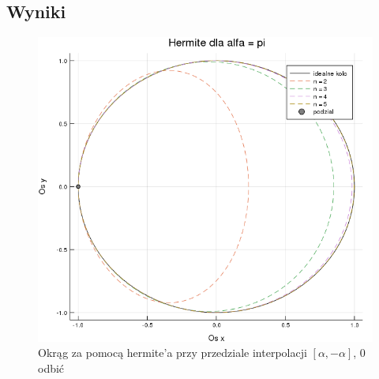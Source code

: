 \documentclass[paper=a4, fontsize=11pt]{scrartcl} %
\numberwithin{equation}{section} %
\numberwithin{figure}{section} %
\numberwithin{table}{section} %
\begin{document}
\subsection{Wyniki}
\begin{figure}[h!]
\centering
 \includegraphics[width=0.8\linewidth]{hermite.png}
  \caption{Okrąg za pomocą hermite'a przy przedziale interpolacji $[\alpha, -\alpha]$, 0 odbić}
  \label{hermite}
\end{figure}
\end{document}
